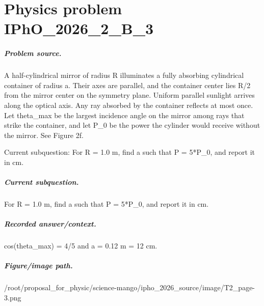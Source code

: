 
\chapter{Physics problem IPhO\_2026\_2\_B\_3}
\label{ch:IPhO2026Problems_problem_IPhO_2026_2_B_3}

\paragraph{Problem source.}
A half-cylindrical mirror of radius R illuminates a fully absorbing cylindrical
container of radius a.  Their axes are parallel, and the container center lies
R/2 from the mirror center on the symmetry plane.  Uniform parallel sunlight
arrives along the optical axis.  Any ray absorbed by the container reflects at
most once.  Let theta\_max be the largest incidence angle on the mirror among
rays that strike the container, and let P\_0 be the power the cylinder would
receive without the mirror.  See Figure 2f.

Current subquestion:
For R = 1.0 m, find a such that P = 5*P\_0, and report it in cm.

\paragraph{Current subquestion.}
For R = 1.0 m, find a such that P = 5*P\_0, and report it in cm.

\paragraph{Recorded answer/context.}
cos(theta\_max) = 4/5 and a = 0.12 m = 12 cm.

\paragraph{Figure/image path.}
/root/proposal\_for\_physic/science-mango/ipho\_2026\_source/image/T2\_page-3.png

